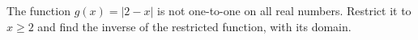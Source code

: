 The function $g(x)=|2-x|$ is not one-to-one on all real numbers. Restrict it to $x\ge2$ and find the inverse of the restricted function, with its domain.
